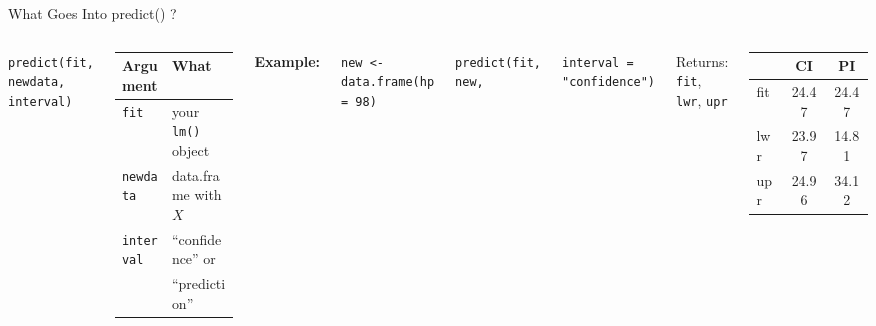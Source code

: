 \documentclass[aspectratio=169, 11pt]{beamer}
\begin{document}
\begin{frame}{What Goes Into predict() ?}

\begin{columns}
\texttt{predict(fit, newdata, interval)}

\vspace{0.5em}
\begin{tabular}{ll}
\toprule
Argument & What \\
\midrule
\texttt{fit} & your \texttt{lm()} object \\
\texttt{newdata} & data.frame with $X$ \\
\texttt{interval} & ``confidence'' or \\
 & ``prediction'' \\
\bottomrule
\end{tabular}

\textbf{Example:}

\vspace{0.3em}
\footnotesize
\texttt{new <- data.frame(hp = 98)}

\texttt{predict(fit, new,}

\texttt{\phantom{predict(}interval = "confidence")}

\vspace{0.3em}
\normalsize
Returns: \texttt{fit}, \texttt{lwr}, \texttt{upr}

\vspace{0.3em}
\begin{tabular}{lcc}
\toprule
& CI & PI \\
\midrule
fit & 24.47 & 24.47 \\
lwr & 23.97 & 14.81 \\
upr & 24.96 & 34.12 \\
\bottomrule
\end{tabular}
\end{columns}
\end{frame}
\end{document}

